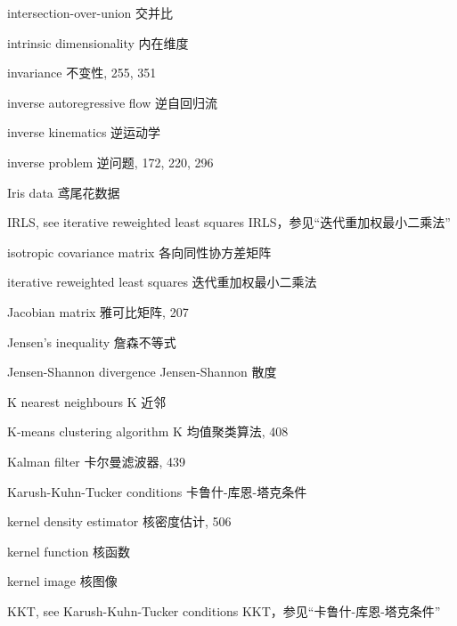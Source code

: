 intersection-over-union 交并比\par
intrinsic dimensionality 内在维度\par
invariance 不变性, 255, 351\par
inverse autoregressive flow 逆自回归流\par
inverse kinematics 逆运动学\par
inverse problem 逆问题, 172, 220, 296\par
Iris data 鸢尾花数据\par
IRLS, see iterative reweighted least squares IRLS，参见“迭代重加权最小二乘法”\par
isotropic covariance matrix 各向同性协方差矩阵\par
iterative reweighted least squares 迭代重加权最小二乘法\par
Jacobian matrix 雅可比矩阵, 207\par
Jensen’s inequality 詹森不等式\par
Jensen-Shannon divergence Jensen-Shannon 散度\par
K nearest neighbours K 近邻\par
K-means clustering algorithm K 均值聚类算法, 408\par
Kalman filter 卡尔曼滤波器, 439\par
Karush-Kuhn-Tucker conditions 卡鲁什-库恩-塔克条件\par
kernel density estimator 核密度估计, 506\par
kernel function 核函数\par
kernel image 核图像\par
KKT, see Karush-Kuhn-Tucker conditions KKT，参见“卡鲁什-库恩-塔克条件”\par

